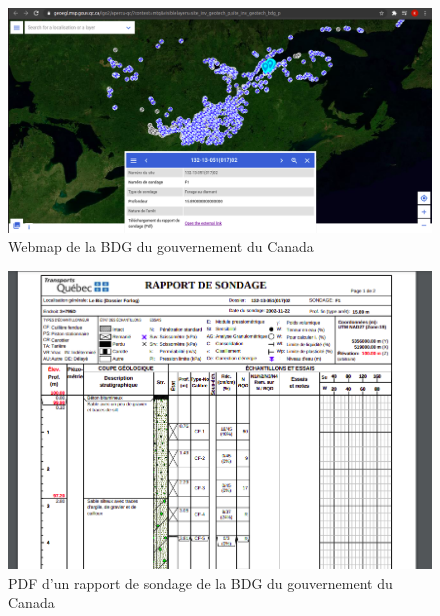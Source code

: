 \begin{figure}[t]
    \centering
    \includegraphics[width=1\textwidth]{images/Contexte/bdg.png}
    \caption{Webmap de la BDG du gouvernement du Canada}
    \label{fig:BDG}
\end{figure}
\begin{figure}[t]
    \centering
    \includegraphics[width=1\textwidth]{images/Contexte/pdf_bdg.png}
    \caption{PDF d'un rapport de sondage de la BDG du gouvernement du Canada}
    \label{fig:PDF_BDG}
\end{figure}
